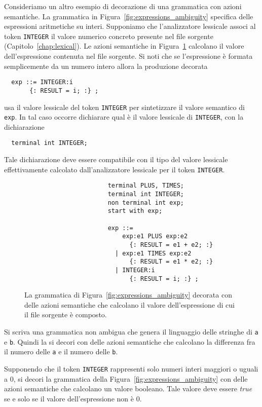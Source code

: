Consideriamo un altro esempio di decorazione di una grammatica
con azioni semantiche. La grammatica in
Figura~\ref{fig:expressions_ambiguity} specifica delle espressioni aritmetiche
su interi. Supponiamo che l'analizzatore lessicale associ al token
\texttt{INTEGER} il valore numerico concreto presente nel file
sorgente (Capitolo~\ref{chap:lexical}). Le azioni semantiche in
Figura~\ref{fig:expressions_decoration} calcolano il valore dell'espressione
contenuta nel file sorgente. Si noti che se l'espressione \`e formata
semplicemente da un numero intero allora la produzione decorata
%
\begin{verbatim}
  exp ::= INTEGER:i
       {: RESULT = i; :} ;
\end{verbatim}
%
usa il valore lessicale del token \texttt{INTEGER} per sintetizzare il
valore semantico di \texttt{exp}. In tal caso occorre dichiarare
qual \`e il valore lessicale di \texttt{INTEGER}, con la dichiarazione
%
\begin{verbatim}
  terminal int INTEGER;
\end{verbatim}
%
Tale dichiarazione deve essere compatibile con il tipo del valore
lessicale effettivamente calcolato dall'analizzatore lessicale per il token
\texttt{INTEGER}.

\begin{figure}[t]
\begin{verbatim}
                       terminal PLUS, TIMES;
                       terminal int INTEGER;
                       non terminal int exp;
                       start with exp;

                       exp ::=
                           exp:e1 PLUS exp:e2
                             {: RESULT = e1 + e2; :}
                         | exp:e1 TIMES exp:e2
                             {: RESULT = e1 * e2; :}
                         | INTEGER:i
                             {: RESULT = i; :} ;
\end{verbatim}
\caption{La grammatica di Figura~\ref{fig:expressions_ambiguity}
         decorata con delle
         azioni semantiche che calcolano il valore dell'espressione di cui
         il file sorgente \`e composto.}
  \label{fig:expressions_decoration}
\end{figure}

\begin{exercise}\label{ex:decoration1}
Si scriva una grammatica non ambigua che genera il linguaggio delle
stringhe di \texttt{a} e \texttt{b}. Quindi la si decori con delle
azioni semantiche che calcolano la differenza fra il numero delle \texttt{a}
e il numero delle \texttt{b}.
\end{exercise}
%
\begin{exercise}\label{ex:decoration2}
Supponendo che il token \texttt{INTEGER} rappresenti solo numeri interi
maggiori o uguali a $0$, si decori la grammatica della
Figura~\ref{fig:expressions_ambiguity} con delle azioni semantiche che
calcolano un valore booleano. Tale valore deve essere \textit{true}
se e solo se il valore dell'espressione non \`e $0$.
\end{exercise}

